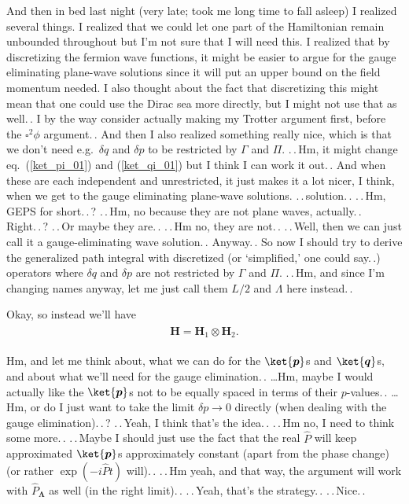 \documentclass{report}
\begin{document}
And then in bed last night (very late; %
took me long time to fall asleep) I realized several things. I realized that we could let one part of the Hamiltonian remain unbounded throughout but I'm not sure that I will need this. I realized that by discretizing the fermion wave functions, it might be easier to argue for the gauge eliminating plane-wave solutions since it will put an upper bound on the field momentum needed. I also thought about the fact that discretizing this might mean that one could use the Dirac sea more directly, but I might not use that as well.\,. I by the way consider actually making my Trotter argument first, before the $\square^2\phi$ argument.\,. And then I also realized something really nice, which is that we don't need e.g.\ $\delta q$ and $\delta p$ to be restricted by $\Gamma$ and $\Pi$. .\,.\,Hm, it might change eq.\ (\ref{ket_pi_01}) and (\ref{ket_qi_01}) but I think I can work it out.\,. And when these are each independent and unrestricted, it just makes it a lot nicer, I think, when we get to the gauge eliminating plane-wave solutions. .\,.\,solution.\,. .\,.\,Hm, GEPS for short.\,.\,? .\,.\,Hm, no because they are not plane waves, actually.\,. Right.\,.\,? .\,.\,Or maybe they are.\,. .\,.\,Hm no, they are not.\,. .\,.\,Well, then we can just call it a gauge-eliminating wave solution.\,. Anyway.\,. So now I should try to derive the generalized path integral with discretized (or `simplified,' one could say.\,.) operators where $\delta q$ and $\delta p$ are not restricted by $\Gamma$ and $\Pi$. .\,.\,Hm, and since I'm changing names anyway, let me just call them $L/2$ and $\Lambda$ here instead.\,.

Okay, so instead we'll have
\begin{align}
\begin{aligned}
	\textbf{H} = \textbf{H}_1 \otimes \textbf{H}_2.
\end{aligned}
\end{align} 

Hm, and let me think about, what we can do for the $\ket{\boldsymbol{p}}$s and $\ket{\boldsymbol{q}}$s, and about what we'll need for the gauge elimination.\,. \ldots Hm, maybe I would actually like the $\ket{\boldsymbol{p}}$s not to be equally spaced in terms of their $p$-values.\,. \ldots Hm, or do I just want to take the limit $\delta p \to 0$ directly (when dealing with the gauge elimination).\,.\,? .\,.\,Yeah, I think that's the idea.\,. .\,.\,Hm no, I need to think some more.\,. .\,.\,Maybe I should just use the fact that the real $\hat P$ will keep approximated $\ket{\boldsymbol{p}}$s approximately constant (apart from the phase change) (or rather $\exp(-i \hat P t)$ will).\,. .\,.\,Hm yeah, and that way, the argument will work with $\hat P_{\boldsymbol{\Lambda}}$ as well (in the right limit).\,. .\,.\,Yeah, that's the strategy.\,. .\,.\,Nice.\,. 
\end{document}
